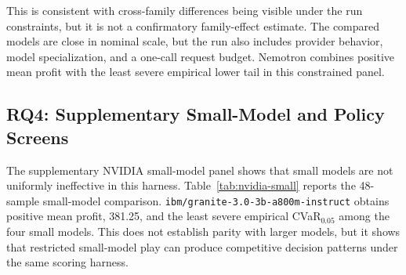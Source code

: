 \documentclass[11pt]{article}
\begin{document}
\begin{table}[t]
    \centering
    \caption{NVIDIA constrained roughly same-scale family panel. Each model has 48 session samples. The CVaR low-support flag is false for all rows, but the effective 5\% tail mass is 2.4 sessions. The run uses \texttt{max\_remote\_calls\_per\_agent=1}.}
    \label{tab:nvidia}
\end{table}

This is consistent with cross-family differences being visible under the run constraints, but it is not a confirmatory family-effect estimate. The compared models are close in nominal scale, but the run also includes provider behavior, model specialization, and a one-call request budget. Nemotron combines positive mean profit with the least severe empirical lower tail in this constrained panel.

\subsection{RQ4: Supplementary Small-Model and Policy Screens}
The supplementary NVIDIA small-model panel shows that small models are not uniformly ineffective in this harness. Table~\ref{tab:nvidia-small} reports the 48-sample small-model comparison. \texttt{ibm/granite-3.0-3b-a800m-instruct} obtains positive mean profit, 381.25, and the least severe empirical CVaR$_{0.05}$ among the four small models. This does not establish parity with larger models, but it shows that restricted small-model play can produce competitive decision patterns under the same scoring harness.
\end{document}
